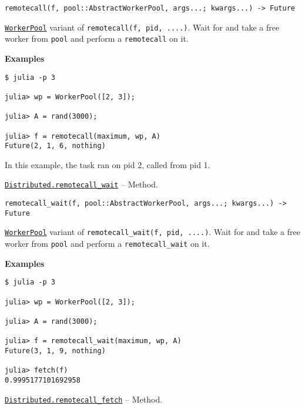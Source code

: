 \begin{adjustwidth}{2em}{0pt}


\begin{verbatim}
remotecall(f, pool::AbstractWorkerPool, args...; kwargs...) -> Future
\end{verbatim}

\hyperlink{17976394752057970100}{\texttt{WorkerPool}} variant of \texttt{remotecall(f, pid, ....)}. Wait for and take a free worker from \texttt{pool} and perform a \texttt{remotecall} on it.

\textbf{Examples}


\begin{verbatim}
$ julia -p 3

julia> wp = WorkerPool([2, 3]);

julia> A = rand(3000);

julia> f = remotecall(maximum, wp, A)
Future(2, 1, 6, nothing)
\end{verbatim}

In this example, the task ran on pid 2, called from pid 1.



\end{adjustwidth}
\hypertarget{1493466248843041179}{} 
\hyperlink{1493466248843041179}{\texttt{Distributed.remotecall\_wait}}  -- {Method.}

\begin{adjustwidth}{2em}{0pt}


\begin{verbatim}
remotecall_wait(f, pool::AbstractWorkerPool, args...; kwargs...) -> Future
\end{verbatim}

\hyperlink{17976394752057970100}{\texttt{WorkerPool}} variant of \texttt{remotecall\_wait(f, pid, ....)}. Wait for and take a free worker from \texttt{pool} and perform a \texttt{remotecall\_wait} on it.

\textbf{Examples}


\begin{verbatim}
$ julia -p 3

julia> wp = WorkerPool([2, 3]);

julia> A = rand(3000);

julia> f = remotecall_wait(maximum, wp, A)
Future(3, 1, 9, nothing)

julia> fetch(f)
0.9995177101692958
\end{verbatim}



\end{adjustwidth}
\hypertarget{6431566786299199412}{} 
\hyperlink{6431566786299199412}{\texttt{Distributed.remotecall\_fetch}}  -- {Method.}

